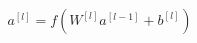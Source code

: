 \documentclass[preview]{standalone}
\begin{document}
\begin{align*}
a^{[l]} = f\left(W^{[l]}a^{[l-1]} + b^{[l]}\right)
\end{align*}
\end{document}
